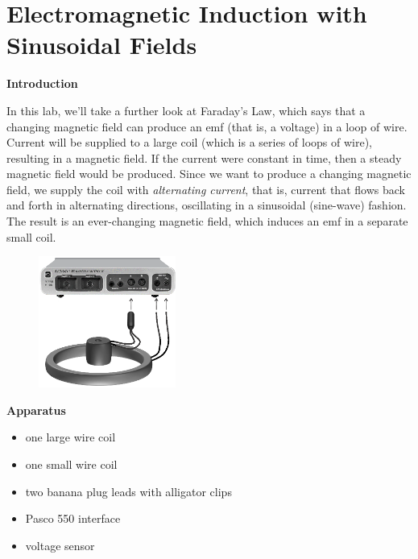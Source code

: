 
\section{Electromagnetic Induction with Sinusoidal Fields}

\makelabheader %

\bigskip

\textbf{Introduction}

In this lab, we'll take a further look at Faraday's Law, which says
that a changing magnetic field can produce an emf (that is, a voltage)
in a loop of wire.  Current will be supplied to a large coil (which is a 
series of loops of wire), resulting in a magnetic field.  
If the current were constant in time,
then a steady magnetic field would be produced.  Since we want to
produce a changing magnetic field, we supply the coil with {\it
alternating current}, that is, current that flows back and forth in
alternating directions, oscillating in a sinusoidal (sine-wave) fashion.  The
result is an ever-changing magnetic field, which induces an emf in
a separate small coil.

\begin{figure}
\vspace{0.2in}

\hspace{0.4in}
    \includegraphics[width=0.4\textwidth]{induction_sinusoidal/induction2_setup_550.eps}
\end{figure}

\bigskip

\textbf{Apparatus}
\begin{itemize}
\setlength\itemsep{0pt} %
\item one large wire coil
\item one small wire coil
\item two banana plug leads with alligator clips
\item Pasco 550 interface
\item voltage sensor
\end{itemize}


